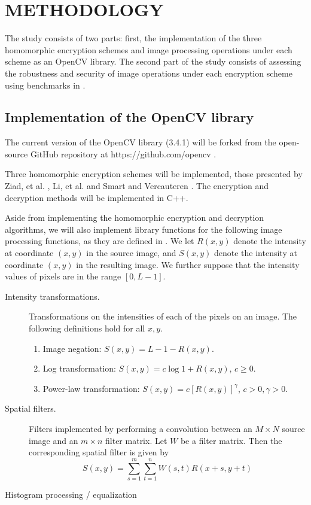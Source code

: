 \chapter{METHODOLOGY}

The study consists of two parts: first, the implementation of the three homomorphic encryption schemes and image processing operations under each scheme as an OpenCV library. The second part of the study consists of assessing the robustness and security of image operations under each encryption scheme using benchmarks in \cite{ahmed_benchmark_2016}.

\section{Implementation of the OpenCV library}

The current version of the OpenCV library (3.4.1) will be forked from the open-source GitHub repository at https://github.com/opencv \cite{opencv_library}.

Three homomorphic encryption schemes will be implemented, those presented by Ziad, et al. \cite{ziad_cryptoimg:_2016}, Li, et al. \cite{li_elliptic_2012} and Smart and Vercauteren \cite{hutchison_fully_2010}. The encryption and decryption methods will be implemented in C++.

Aside from implementing the homomorphic encryption and decryption algorithms, we will also implement library functions for the following image processing functions, as they are defined in \cite{gonzalez_digital_2008}. We let $R(x,y)$ denote the intensity at coordinate $(x,y)$ in the source image, and $S(x,y)$ denote the intensity at coordinate $(x,y)$ in the resulting image. We further suppose that the intensity values of pixels are in the range $[0, L-1]$.
\begin{description}
	\item[Intensity transformations.] Transformations on the intensities of each of the pixels on an image. The following definitions hold for all $x,y$.
	\begin{enumerate}
		\item Image negation: $S(x,y) = L - 1 - R(x,y)$.
		\item Log transformation: $S(x,y) = c\log{1 + R(x,y)}$, $c \geq 0$.
		\item Power-law transformation: $S(x,y) = c[R(x,y)]^\gamma$, $c > 0, \gamma > 0$.
	\end{enumerate}
	\item[Spatial filters.] Filters implemented by performing a convolution between an $M\times N$ source image and an $m\times n$ filter matrix. Let $W$ be a filter matrix. Then the corresponding spatial filter is given by
	\begin{equation}
		S(x,y) = \sum_{s=1}^m{\sum_{t=1}^n{W(s,t)R(x+s,y+t)}}
	\end{equation}
	\item [Histogram processing / equalization]

\end{description}

